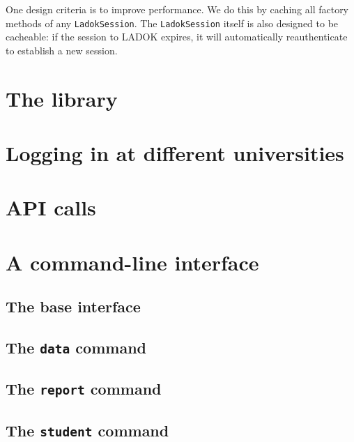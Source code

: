 \documentclass[a4paper,oneside]{book}
\begin{document}
One design criteria is to improve performance.
We do this by caching all factory methods of any \texttt{LadokSession}.
The \texttt{LadokSession} itself is also designed to be cacheable: if the session to 
LADOK expires, it will automatically reauthenticate to establish a new session.



\part{The library}




\part{Logging in at different universities}




\part{API calls}






\part{A command-line interface}

\chapter{The base interface}



\chapter{The \texttt{data} command}



\chapter{The \texttt{report} command}



\chapter{The \texttt{student} command}
\end{document}
